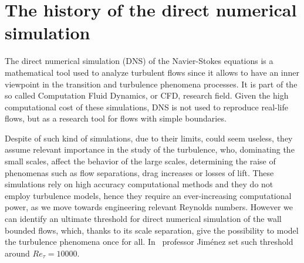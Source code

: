 \section{The history of the direct numerical simulation}
The direct numerical simulation (DNS) of the Navier-Stokes equations is a mathematical tool used to analyze turbulent flows since it allows to have an inner viewpoint in the transition and turbulence phenomena processes. It is part of the so called Computation Fluid Dynamics, or CFD, research field. 
Given the high computational cost of these simulations, DNS is not used to reproduce real-life flows, but as a research tool for flows with simple boundaries\cite{dns:tool}. \par
Despite of such kind of simulations, due to their limits, could seem useless, they assume relevant importance in the study of the turbulence, who, dominating the small scales, affect the behavior of the large scales, determining the raise of phenomenas such as flow separations, drag increases or losses of lift.
These simulations rely on high accuracy computational methods and they do not employ turbulence models, hence they require an ever-increasing computational power, as we move towards engineering relevant Reynolds numbers. 
However we can identify an ultimate threshold for direct numerical simulation of the wall bounded flows, which, thanks to its scale separation,  give the possibility to model the turbulence phenomena once for all. In~\cite{Jimenez2003} professor Jiménez set such threshold around $Re_{\tau}=10000$.\\~\par




